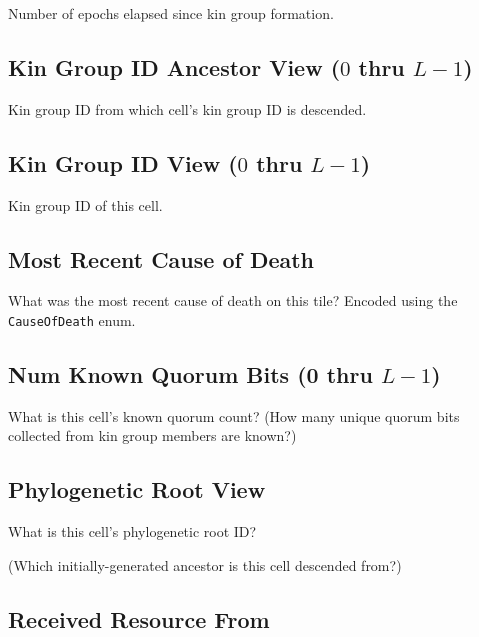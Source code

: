 
Number of epochs elapsed since kin group formation.

\subsection{Kin Group ID Ancestor View ($0$ thru $L - 1$)}


Kin group ID from which cell's kin group ID is descended.

\subsection{Kin Group ID View ($0$ thru $L - 1$)}


Kin group ID of this cell.

\subsection{Most Recent Cause of Death}


What was the most recent cause of death on this tile?
Encoded using the \texttt{CauseOfDeath} enum.

\subsection{Num Known Quorum Bits (0 thru $L-1$)}


What is this cell's known quorum count?
(How many unique quorum bits collected from kin group members are known?)

\subsection{Phylogenetic Root View}


What is this cell's phylogenetic root ID?

(Which initially-generated ancestor is this cell descended from?)

\subsection{Received Resource From}

